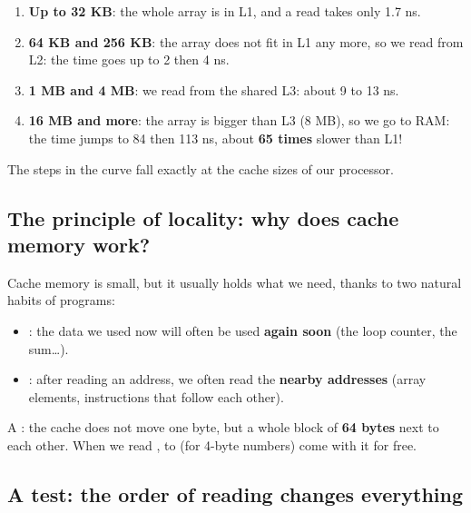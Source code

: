 \begin{khatwa}
    \begin{enumerate}
        \item \textbf{Up to 32 KB}: the whole array is in L1, and a read takes only 1.7 ns.
        \item \textbf{64 KB and 256 KB}: the array does not fit in L1 any more, so we read from L2: the time goes up to 2 then 4 ns.
        \item \textbf{1 MB and 4 MB}: we read from the shared L3: about 9 to 13 ns.
        \item \textbf{16 MB and more}: the array is bigger than L3 (8 MB), so we go to RAM: the time jumps to 84 then 113 ns,
              about \textbf{65 times} slower than L1!
    \end{enumerate}
    The steps in the curve fall exactly at the cache sizes of our processor.
\end{khatwa}

\subsection{The principle of locality: why does cache memory work?}
Cache memory is small, but it usually holds what we need, thanks to two natural habits of programs:
\begin{itemize}
    \item {}: the data we used now will often be used \textbf{again soon}
          (the loop counter, the sum\dots).
    \item {}: after reading an address, we often read the \textbf{nearby addresses}
          (array elements, instructions that follow each other).
\end{itemize}

\begin{tarif}
    A : the cache does not move one byte, but a whole block of \textbf{64 bytes} next to
    each other. When we read ,  to  (for 4-byte numbers) come with it for free.
\end{tarif}

\subsection{A test: the order of reading changes everything}

